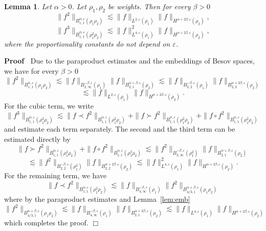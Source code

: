 \documentclass[a4paper,11pt]{article}
\newenvironment{proof}{\noindent\textbf{Proof\ }}{\hspace*{\fill}$\Box$\medskip}
\newtheorem{lemma}[theorem]{Lemma}
\numberwithin{equation}{section}
\begin{document}
\begin{lemma}
  \label{lem:mult}Let $\alpha > 0$. Let $\rho_1, \rho_2$ be weights. Then for
  every $\beta > 0$
  \[ \| f^2 \|_{B^{\alpha, \varepsilon}_{1, 1} (\rho_1 \rho_2)} \lesssim \| f
     \|_{L^{2, \varepsilon} (\rho_1)} \| f \|_{H^{\alpha + 2 \beta,
     \varepsilon} (\rho_2)}, \]
  \[ \| f^3 \|_{B^{\alpha, \varepsilon}_{1, 1} (\rho_1^2 \rho_2)} \lesssim \|
     f \|_{L^{4, \varepsilon} (\rho_1)}^2 \| f \|_{H^{\alpha + 2 \beta,
     \varepsilon} (\rho_2)}, \]
  where the proportionality constants do not depend on $\varepsilon$.
\end{lemma}

\begin{proof}
  Due to the paraproduct estimates and the embeddings of Besov spaces, we have
  for every $\beta > 0$
  \[ \| f^2 \|_{B^{\alpha, \varepsilon}_{1, 1} (\rho_1 \rho_2)} \lesssim \| f
     \|_{B_{2, \infty}^{- \beta, \varepsilon} (\rho_1)} \| f \|_{B_{2,
     1}^{\alpha + \beta, \varepsilon} (\rho_2)} \lesssim \| f \|_{B_{2, 2}^{-
     \beta, \varepsilon} (\rho_1)} \| f \|_{B_{2, 2}^{\alpha + 2 \beta,
     \varepsilon} (\rho_2)} \]
  \[ \lesssim \| f \|_{L^{2, \varepsilon} (\rho_1)} \| f \|_{H^{\alpha + 2
     \beta, \varepsilon} (\rho_2)} . \]
  For the cubic term, we write
  \[ \| f^3 \|_{B^{\alpha, \varepsilon}_{1, 1} (\rho_1^2 \rho_2)} \lesssim \|
     f \prec f^2 \|_{B^{\alpha, \varepsilon}_{1, 1} (\rho_1^2 \rho_2)} + \| f
     \succ f^2 \|_{B^{\alpha, \varepsilon}_{1, 1} (\rho_1^2 \rho_2)} + \| f
     \circ f^2 \|_{B^{\alpha, \varepsilon}_{1, 1} (\rho_1^2 \rho_2)} \]
  and estimate each term separately. The second and the third term can be
  estimated directly by
  \[ \| f \succ f^2 \|_{B^{\alpha, \varepsilon}_{1, 1} (\rho_1^2 \rho_2)} + \|
     f \circ f^2 \|_{B^{\alpha, \varepsilon}_{1, 1} (\rho_1^2 \rho_2)}
     \lesssim \| f^2 \|_{B^{- \beta, \varepsilon}_{2, \infty} (\rho_1^2)} \| f
     \|_{B^{\alpha + \beta, \varepsilon}_{2, 1} (\rho_2)} \]
  \[ \lesssim \| f^2 \|_{B^{- \beta, \varepsilon}_{2, 2} (\rho_1^2)} \| f
     \|_{B^{\alpha + 2 \beta, \varepsilon}_{2, 2} (\rho_2)} \lesssim \| f
     \|_{L^{4, \varepsilon} (\rho_1)}^2 \| f \|_{H^{\alpha + 2 \beta,
     \varepsilon} (\rho_2)} . \]
  For the remaining term, we have
  \[ \| f \prec f^2 \|_{B^{\alpha, \varepsilon}_{1, 1} (\rho_1^2 \rho_2)}
     \lesssim \| f \|_{B^{- \beta, \varepsilon}_{4, \infty} (\rho_1)} \| f^2
     \|_{B^{\alpha + \beta, \varepsilon}_{4 / 3, 1} (\rho_1 \rho_2)} \]
  where by the paraproduct estimates and Lemma~\ref{lem:emb}
  \[ \| f^2 \|_{B^{\alpha + \beta, \varepsilon}_{4 / 3, 1} (\rho_1 \rho_2)}
     \lesssim \| f \|_{B^{- \beta, \varepsilon}_{4, \infty} (\rho_1)} \| f
     \|_{B^{\alpha + 2 \beta, \varepsilon}_{2, 1} (\rho_2)} \lesssim \| f
     \|_{L^{4, \varepsilon} (\rho_1)} \| f \|_{H^{\alpha + 2 \beta,
     \varepsilon} (\rho_2)} \]
  which completes the proof.
\end{proof}
\end{document}

